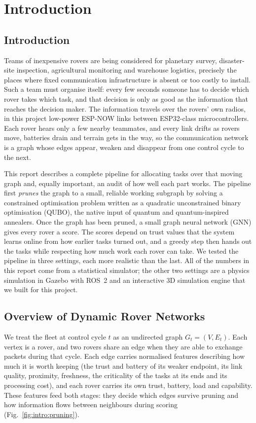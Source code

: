 \chapter{Introduction}
\label{ch:intro}

\section{Introduction}

Teams of inexpensive rovers are being considered for planetary survey,
disaster-site inspection, agricultural monitoring and warehouse logistics,
precisely the places where fixed communication infrastructure is absent or
too costly to install. Such a team must organise itself: every few seconds
someone has to decide which rover takes which task, and that decision is only
as good as the information that reaches the decision maker. The information
travels over the rovers' own radios, in this project low-power ESP-NOW links
between ESP32-class microcontrollers. Each rover hears only a few nearby
teammates, and every link drifts as rovers move, batteries drain and terrain
gets in the way, so the communication network is a graph whose edges appear,
weaken and disappear from one control cycle to the next.

This report describes a complete pipeline for allocating tasks over that
moving graph and, equally important, an audit of how well each part works.
The pipeline first \emph{prunes} the graph to a small, reliable working
subgraph by solving a constrained optimisation problem written as a quadratic
unconstrained binary optimisation (QUBO), the native input of quantum and
quantum-inspired annealers. Once the graph has been pruned, a small graph
neural network (GNN) gives every rover a score. The scores depend on trust
values that the system learns online from how earlier tasks turned out, and a
greedy step then hands out the tasks while respecting how much work each rover
can take. We tested the pipeline in three settings, each more realistic than
the last. All of the numbers in this report come from a statistical simulator;
the other two settings are a physics simulation in Gazebo with ROS~2 and an
interactive 3D simulation engine that we built for this project.

\section{Overview of Dynamic Rover Networks}

We treat the fleet at control cycle $t$ as an undirected graph
$G_t=(V,E_t)$. Each vertex is a rover, and two rovers share an edge when they
are able to exchange packets during that cycle. Each edge carries normalised features describing
how much it is worth keeping (the trust and battery of its weaker endpoint, its
link quality, proximity, freshness, the criticality of the tasks at its ends
and its processing cost), and each rover carries its own trust, battery, load
and capability. These features feed both stages: they decide which edges
survive pruning and how information flows between neighbours during scoring
(Fig.~\ref{fig:intro:pruning}).

